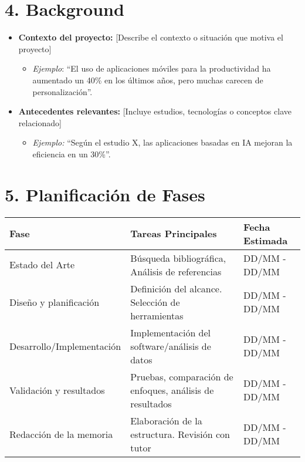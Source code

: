 \documentclass[12pt, a4paper]{article}
\begin{document}
\section*{4. Background}
\begin{itemize}
    \item \textbf{Contexto del proyecto:} [Describe el contexto o situación que motiva el proyecto]
    \begin{itemize}
        \item \textit{Ejemplo}: “El uso de aplicaciones móviles para la productividad ha aumentado un 40\% en los últimos años, pero muchas carecen de personalización”.
    \end{itemize}
    \item \textbf{Antecedentes relevantes:} [Incluye estudios, tecnologías o conceptos clave relacionado]
    \begin{itemize}
        \item \textit{Ejemplo:} “Según el estudio X, las aplicaciones basadas en IA mejoran la eficiencia en un 30\%”.
    \end{itemize}
\end{itemize}


\section*{5. Planificación de Fases}
\begin{tabularx}{\textwidth}{|l|X|l|}
    \hline
    \textbf{Fase} & \textbf{Tareas Principales} & \textbf{Fecha Estimada} \\ \hline
    Estado del Arte & Búsqueda bibliográfica, Análisis de referencias & DD/MM - DD/MM \\ \hline
    Diseño y planificación & Definición del alcance. Selección de herramientas & DD/MM - DD/MM \\ \hline
    Desarrollo/Implementación & Implementación del software/análisis de datos & DD/MM - DD/MM \\ \hline
    Validación y resultados & Pruebas, comparación de enfoques, análisis de resultados & DD/MM - DD/MM \\ \hline
    Redacción de la memoria & Elaboración de la estructura. Revisión con tutor & DD/MM - DD/MM \\ \hline
\end{tabularx}
\end{document}
